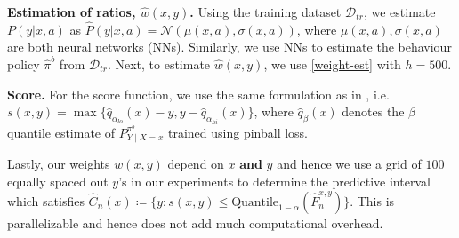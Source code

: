 
\textbf{Estimation of ratios, $\hat{w}(x, y)$.}
Using the training dataset $\mathcal{D}_{tr}$, we estimate $P(y | x, a)$ as $\hat{P}(y | x, a) = \mathcal{N}(\mu(x, a), \sigma(x, a))$, where $\mu(x, a), \sigma(x, a)$ are both neural networks (NNs). Similarly, we use NNs to estimate the behaviour policy $\hat{\pi}^b$ from $\mathcal{D}_{tr}$. Next, to estimate $\hat{w}(x, y)$, we use \eqref{weight-est} with $h = 500$.

\textbf{Score.}
For the score function, we use the same formulation as in \cite{romano2019conformalized}, i.e. $s(x, y) = \max\{ \hat{q}_{\alpha_{lo}}(x) - y, y - \hat{q}_{\alpha_{hi}}(x) \}$, where $\hat{q}_\beta(x)$ denotes the $\beta$ quantile estimate of $P^{\pi^b}_{Y\mid X=x}$ trained using pinball loss.

Lastly, our weights $w(x, y)$ depend on $x$ \textbf{and} $y$ and hence we use a grid of $100$ equally spaced out $y$'s in our experiments to determine the predictive interval which satisfies $\hat{C}_n(x) \coloneqq \{y: s(x,y) \leq \text{Quantile}_{1-\alpha}(\hat{F}_{n}^{x, y})\}$. This is parallelizable and hence does not add much computational overhead.

